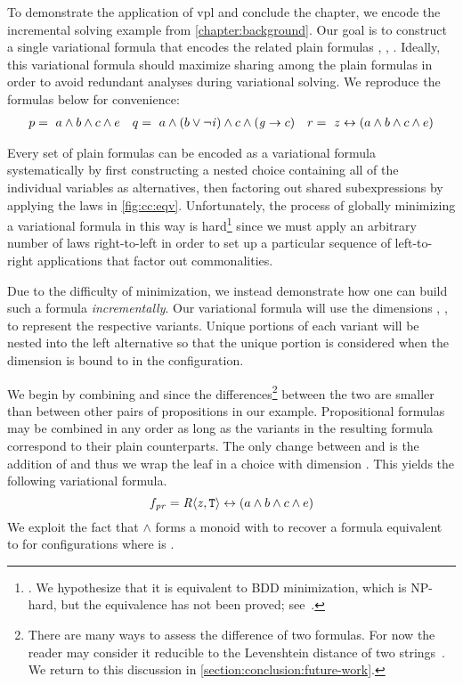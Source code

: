 \label{section:vpl:example}
%
To demonstrate the application of \ac{vpl} and conclude the chapter, we encode
the incremental solving example from \autoref{chapter:background}. Our goal is
to construct a single variational formula that encodes the related plain
formulas \pV{}, \qV{}, \rV{}. Ideally, this variational formula should maximize
sharing among the plain formulas in order to avoid redundant analyses during
variational solving. We reproduce the formulas below for convenience:
%
\begin{align*}
  p =\ a \wedge b \wedge c \wedge e && q=\ a \wedge (b \vee \neg \mathit{i}{}) \wedge c \wedge (\mathit{g}{} \rightarrow c) && r =~z \leftrightarrow (a \wedge b \wedge c \wedge e)
\end{align*}

%
Every set of plain formulas can be encoded as a variational formula
systematically by first constructing a nested choice containing all of the
individual variables as alternatives, then factoring out shared subexpressions
by applying the laws in \autoref{fig:cc:eqv}.
%
Unfortunately, the process of globally minimizing a variational formula in this
way is hard\footnote{\label{vpl:bdd}. We hypothesize that it is equivalent to
  BDD minimization, which is NP-hard, but the equivalence has not been
  proved; see~\cite{Walk14onward}.} since we must apply an arbitrary number of
laws right-to-left in order to set up a particular sequence of left-to-right
applications that factor out commonalities.

Due to the difficulty of minimization, we instead demonstrate how one can build
such a formula \emph{incrementally}.
%
Our variational formula will use the dimensions \dimP, \dimQ, \dimR{} to
represent the respective variants. Unique portions of each variant will be
nested into the left alternative so that the unique portion is considered when
the dimension is bound to \true{} in the configuration.

%
We begin by combining \pV{} and \rV{} since the differences\footnote{There are
  many ways to assess the difference of two formulas. For now the reader may
  consider it reducible to the Levenshtein distance of two
  strings~\cite{Levenshtein_SPD66}. We return to this discussion in
  \autoref{section:conclusion:future-work}.} between the two are smaller than
between other pairs of propositions in our example. Propositional formulas may
be combined in any order as long as the variants in the resulting formula
correspond to their plain counterparts. The only change between \pV{} and \rV{}
is the addition of \zV{} and thus we wrap the leaf in a choice with dimension
\dimR. This yields the following variational formula.
%
\begin{equation*}
  f_{\pV\rV} = \chc[\dimR]{\zV, \tru{}} \leftrightarrow (a \wedge b \wedge c \wedge e)
\end{equation*}
%
%
We exploit the fact that $\wedge$ forms a monoid with \tru{} to recover a
formula equivalent to \pV{} for configurations where \dimR{} is \false.

